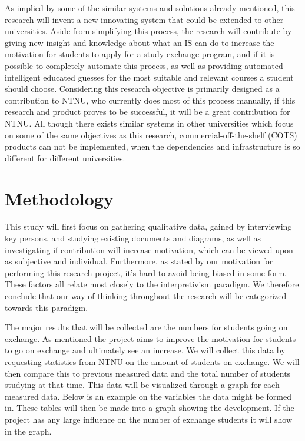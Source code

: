 As implied by some of the similar systems and solutions already mentioned, this research will invent a new innovating system that could be extended to other universities. Aside from simplifying this process, the research will contribute by giving new insight and knowledge about what an IS can do to increase the motivation for students to apply for a study exchange program, and if it is possible to completely automate this process, as well as providing automated intelligent educated guesses for the most suitable and relevant courses a student should choose. Considering this research objective is primarily designed as a contribution to NTNU, who currently does most of this process manually, if this research and product proves to be successful, it will be a great contribution for NTNU. All though there exists similar systems in other universities which focus on some of the same objectives as this research, commercial-off-the-shelf (COTS) products can not be implemented, when the dependencies and infrastructure is so different for different universities.

\section{Methodology}

This study will first focus on gathering qualitative data, gained by interviewing key persons, and studying existing documents and diagrams, as well as investigating if contribution will increase motivation, which can be viewed upon as subjective and individual. Furthermore, as stated by our motivation for performing this research project, it’s hard to avoid being biased in some form. These factors all relate most closely to the interpretivism paradigm. We therefore conclude that our way of thinking throughout the research will be categorized towards this paradigm.

The major results that will be collected are the numbers for students going on exchange. As mentioned the project aims to improve the motivation for students to go on exchange and ultimately see an increase. We will collect this data by requesting statistics from NTNU on the amount of students on exchange. We will then compare this to previous measured data and the total number of students studying at that time. This data will be visualized through a graph for each measured data. Below is an example on the variables the data might be formed in. These tables will then be made into a graph showing the development. If the project has any large influence on the number of exchange students it will show in the graph.

